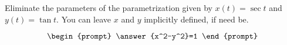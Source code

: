 \documentclass{ximera}
\author{Gregory Hartman \and Matthew Carr}
\begin{document}
\begin{exercise}




Eliminate the parameters of the parametrization given by $x(t)=\sec t$ and $y(t)=\tan t$. You can leave $x$ and $y$ implicitly defined, if need be.

\[
\begin{prompt}
\answer{x^2-y^2}=1
\end{prompt}
\]

\end{exercise}
\end{document}
